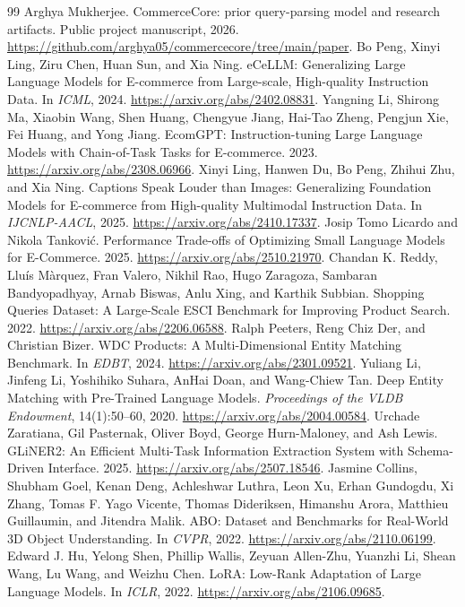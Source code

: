 \begin{thebibliography}{99}
 Arghya Mukherjee. CommerceCore: prior query-parsing model and research artifacts. Public project manuscript, 2026. \url{https://github.com/arghya05/commercecore/tree/main/paper}.
 Bo Peng, Xinyi Ling, Ziru Chen, Huan Sun, and Xia Ning. eCeLLM: Generalizing Large Language Models for E-commerce from Large-scale, High-quality Instruction Data. In \emph{ICML}, 2024. \url{https://arxiv.org/abs/2402.08831}.
 Yangning Li, Shirong Ma, Xiaobin Wang, Shen Huang, Chengyue Jiang, Hai-Tao Zheng, Pengjun Xie, Fei Huang, and Yong Jiang. EcomGPT: Instruction-tuning Large Language Models with Chain-of-Task Tasks for E-commerce. 2023. \url{https://arxiv.org/abs/2308.06966}.
 Xinyi Ling, Hanwen Du, Bo Peng, Zhihui Zhu, and Xia Ning. Captions Speak Louder than Images: Generalizing Foundation Models for E-commerce from High-quality Multimodal Instruction Data. In \emph{IJCNLP-AACL}, 2025. \url{https://arxiv.org/abs/2410.17337}.
 Josip Tomo Licardo and Nikola Tankovi\'{c}. Performance Trade-offs of Optimizing Small Language Models for E-Commerce. 2025. \url{https://arxiv.org/abs/2510.21970}.
 Chandan K. Reddy, Llu\'{i}s M\`arquez, Fran Valero, Nikhil Rao, Hugo Zaragoza, Sambaran Bandyopadhyay, Arnab Biswas, Anlu Xing, and Karthik Subbian. Shopping Queries Dataset: A Large-Scale ESCI Benchmark for Improving Product Search. 2022. \url{https://arxiv.org/abs/2206.06588}.
 Ralph Peeters, Reng Chiz Der, and Christian Bizer. WDC Products: A Multi-Dimensional Entity Matching Benchmark. In \emph{EDBT}, 2024. \url{https://arxiv.org/abs/2301.09521}.
 Yuliang Li, Jinfeng Li, Yoshihiko Suhara, AnHai Doan, and Wang-Chiew Tan. Deep Entity Matching with Pre-Trained Language Models. \emph{Proceedings of the VLDB Endowment}, 14(1):50--60, 2020. \url{https://arxiv.org/abs/2004.00584}.
 Urchade Zaratiana, Gil Pasternak, Oliver Boyd, George Hurn-Maloney, and Ash Lewis. GLiNER2: An Efficient Multi-Task Information Extraction System with Schema-Driven Interface. 2025. \url{https://arxiv.org/abs/2507.18546}.
 Jasmine Collins, Shubham Goel, Kenan Deng, Achleshwar Luthra, Leon Xu, Erhan Gundogdu, Xi Zhang, Tomas F. Yago Vicente, Thomas Dideriksen, Himanshu Arora, Matthieu Guillaumin, and Jitendra Malik. ABO: Dataset and Benchmarks for Real-World 3D Object Understanding. In \emph{CVPR}, 2022. \url{https://arxiv.org/abs/2110.06199}.
 Edward J. Hu, Yelong Shen, Phillip Wallis, Zeyuan Allen-Zhu, Yuanzhi Li, Shean Wang, Lu Wang, and Weizhu Chen. LoRA: Low-Rank Adaptation of Large Language Models. In \emph{ICLR}, 2022. \url{https://arxiv.org/abs/2106.09685}.

\end{thebibliography}
